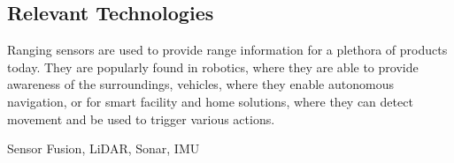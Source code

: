 \subsection{Relevant Technologies}

\noindent Ranging sensors are used to provide range information for a plethora of products today. They are popularly found in robotics, where they are able to provide awareness of the surroundings, vehicles, where they enable autonomous navigation, or for smart facility and home solutions, where they can detect movement and be used to trigger various actions.

\noindent Sensor Fusion, LiDAR, Sonar, IMU


